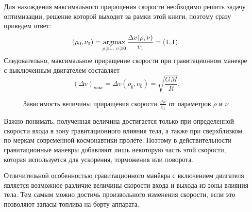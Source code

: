 Для нахождения максимального приращения скорости необходимо решить задачу оптимизации, решение которой выходит за рамки этой книги, поэтому сразу приведем ответ:
\begin{equation*}
    (\rho_0, \nu_0)
        = \underset{\rho \geqslant 1,~\nu \geqslant 0} {\operatorname{argmax}}\, \frac{\Delta v (\rho, \nu)}{v_1} 
        = (1, 1).
\end{equation*}
Следовательно, максимальное приращение скорости при гравитационном маневре с выключенным двигателем составляет
\begin{equation*}
    (\Delta v)_\text{макс}
        = \Delta v (\rho_0, \nu_0)
        = \sqrt{\frac{G M}{R}}.
\end{equation*}

\begin{wrapfigure}[11]{r}{0.45\tw}
    \vspace{-1.2pc}
    \caption{Зависимость величины приращения скорости $\frac{\Delta v}{v_1}$ от параметров $\rho$ и $\nu$}
\end{wrapfigure}
Важно понимать, полученная величина достигается только при определенной скорости входа в зону гравитационного влияния тела, а также при сверхблизком по меркам современной космонавтики пролёте. Поэтому в действительности гравитационные маневры добавляют лишь некоторую часть этой скорости, которая используется для ускорения, торможения или поворота.

Отличительной особенностью гравитационного манёвра с включением двигателя является возможное различие величины скорости входа и выхода из зоны влияния тела. Тем самым можно достичь произвольного изменения скорости, если это позволяют запасы топлива на борту аппарата.

